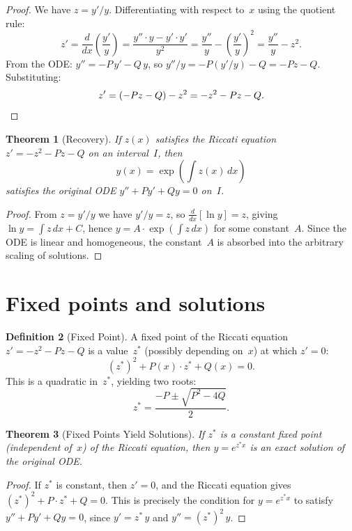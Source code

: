 \documentclass{amsart}
\newtheorem{theorem}{Theorem}[section]
\theoremstyle{definition}
\newtheorem{definition}[theorem]{Definition}
\theoremstyle{remark}
\begin{document}
\begin{proof}
We have $z = y'/y$. Differentiating with respect to~$x$ using the quotient rule:
\[
z' = \frac{d}{dx}\!\left(\frac{y'}{y}\right) = \frac{y''\cdot y - y'\cdot y'}{y^2} = \frac{y''}{y} - \left(\frac{y'}{y}\right)^{\!2} = \frac{y''}{y} - z^2.
\]
From the ODE: $y'' = -P\,y' - Q\,y$, so $y''/y = -P(y'/y) - Q = -Pz - Q$. Substituting:
\[
z' = (-Pz - Q) - z^2 = -z^2 - Pz - Q. \qedhere
\]
\end{proof}

\begin{theorem}[Recovery]\label{thm:recovery}
If $z(x)$ satisfies the Riccati equation $z' = -z^2 - Pz - Q$ on an interval~$I$, then
\[
y(x) = \exp\!\left(\int z(x)\,dx\right)
\]
satisfies the original ODE $y'' + Py' + Qy = 0$ on~$I$.
\end{theorem}

\begin{proof}
From $z = y'/y$ we have $y'/y = z$, so $\frac{d}{dx}[\ln y] = z$, giving $\ln y = \int z\,dx + C$, hence $y = A\cdot\exp(\int z\,dx)$ for some constant~$A$. Since the ODE is linear and homogeneous, the constant~$A$ is absorbed into the arbitrary scaling of solutions.
\end{proof}

\section{Fixed points and solutions}

\begin{definition}[Fixed Point]
A fixed point of the Riccati equation $z' = -z^2 - Pz - Q$ is a value~$z^*$ (possibly depending on~$x$) at which $z' = 0$:
\[
(z^*)^2 + P(x)\cdot z^* + Q(x) = 0.
\]
This is a quadratic in~$z^*$, yielding two roots:
\[
z^* = \frac{-P \pm \sqrt{P^2 - 4Q}}{2}.
\]
\end{definition}

\begin{theorem}[Fixed Points Yield Solutions]\label{thm:fixed-pts}
If $z^*$ is a constant fixed point (independent of~$x$) of the Riccati equation, then $y = e^{z^* x}$ is an exact solution of the original ODE.
\end{theorem}

\begin{proof}
If $z^*$ is constant, then $z' = 0$, and the Riccati equation gives $(z^*)^2 + P\cdot z^* + Q = 0$. This is precisely the condition for $y = e^{z^* x}$ to satisfy $y'' + Py' + Qy = 0$, since $y' = z^*\,y$ and $y'' = (z^*)^2\,y$.
\end{proof}
\end{document}
